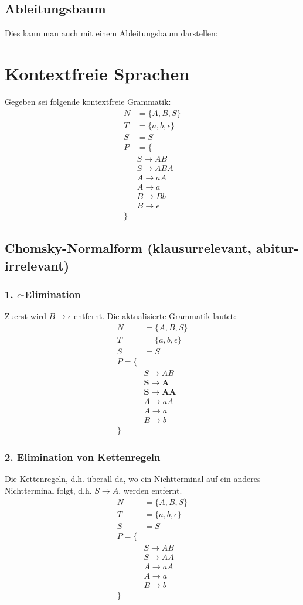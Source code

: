 \documentclass{article}
\newcommand{\ra}{\rightarrow}
\begin{document}
\subsection{Ableitungsbaum}
Dies kann man auch mit einem Ableitungsbaum darstellen:
\section{Kontextfreie Sprachen}
Gegeben sei folgende kontextfreie Grammatik:
\begin{align*}
    N&=\{A,B,S\}\\
    T&=\{a,b,\epsilon\}\\
    S&=S\\
    P&=\{\\
        &S\ra AB\\
        &S\ra ABA\\
        &A\ra aA\\
        &A\ra a\\
        &B\ra Bb\\
        &B\ra \epsilon\\
    \}
\end{align*}
\subsection{Chomsky-Normalform (klausurrelevant, abitur-irrelevant)}
\label{cnf}
\subsubsection{1. $\epsilon$-Elimination}
Zuerst wird $B\ra \epsilon$ entfernt. Die aktualisierte Grammatik lautet:
\begin{align*}
    N&=\{A,B,S\}\\
    T&=\{a,b,\epsilon\}\\
    S&=S\\
    P=\{\\
    &S\ra AB\\
    &\mathbf{S\ra A}\\
    &\mathbf{S\ra AA}\\
    &A\ra aA\\
    &A\ra a\\
    &B\ra b\\
    \}
\end{align*}
\subsubsection{2. Elimination von Kettenregeln}
Die Kettenregeln, d.h. überall da, wo ein Nichtterminal auf ein anderes Nichtterminal folgt, d.h. $S\ra A$, werden entfernt.
\begin{align*}
    N&=\{A,B,S\}\\
    T&=\{a,b,\epsilon\}\\
    S&=S\\
    P=\{\\
    &S\ra AB\\
    &S\ra AA\\
    &A\ra aA\\
    &A\ra a\\
    &B\ra b\\
    \}
\end{align*}
\end{document}
